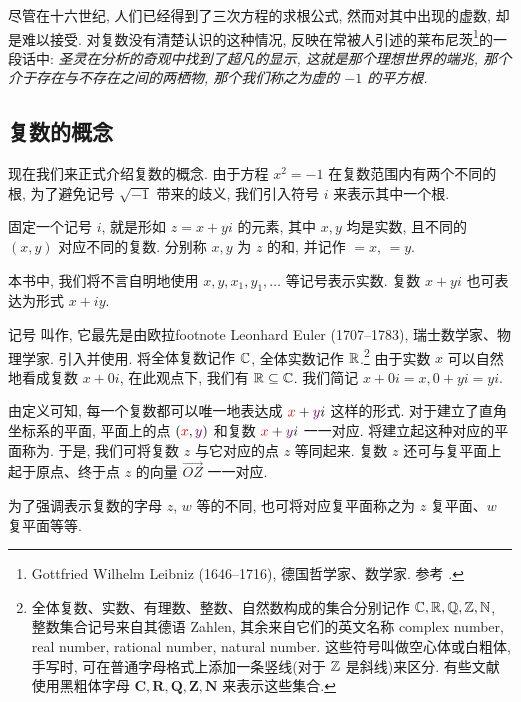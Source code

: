 尽管在十六世纪, 人们已经得到了三次方程的求根公式, 然而对其中出现的虚数, 却是难以接受.
对复数没有清楚认识的这种情况, 反映在常被人引述的莱布尼茨\footnote{%
  Gottfried Wilhelm Leibniz (1646--1716), 德国哲学家、数学家.
  参考 \cite[第13章2节]{Kline1990}.
}的一段话中: \textcolor{third}{\itshape 圣灵在分析的奇观中找到了超凡的显示, 这就是那个理想世界的端兆, 那个介于存在与不存在之间的两栖物, 那个我们称之为虚的 $-1$ 的平方根.}




\subsection{复数的概念}

现在我们来正式介绍复数的概念.
由于方程 $x^2=-1$ 在复数范围内有两个不同的根, 为了避免记号 $\sqrt{-1}$ 带来的歧义, 我们引入符号 $i$ 来表示其中一个根.

\begin{definition}
  固定一个记号 $i$, 就是形如 $z=x+yi$ 的元素, 其中 $x,y$ 均是实数, 且不同的 $(x,y)$ 对应不同的复数.
  分别称 $x,y$ 为 $z$ 的和, 并记作 ${}=x$, ${}=y$.
\end{definition}

本书中, 我们将不言自明地使用 $x,y,x_1,y_1,\dots$ 等记号表示实数.
复数 $x+yi$ 也可表达为形式 $x+iy$.

记号  叫作, 它最先是由欧拉footnote{%
  Leonhard Euler (1707--1783), 瑞士数学家、物理学家.
}引入并使用.
将\alert{全体复数记作 ${\mathbb{C}}$}, 全体实数记作 ${\mathbb{R}}$.\footnote{%
  全体复数、实数、有理数、整数、自然数构成的集合分别记作 ${\mathbb{C}},{\mathbb{R}},{\mathbb{Q}},{\mathbb{Z}},{\mathbb{N}}$, 整数集合记号来自其德语 Zahlen, 其余来自它们的英文名称 complex number, real number, rational number, natural number.
  这些符号叫做空心体或白粗体, 手写时, 可在普通字母格式上添加一条竖线(对于 ${\mathbb{Z}}$ 是斜线)来区分.
  有些文献使用黑粗体字母 $\mathbf{C,R,Q,Z,N}$ 来表示这些集合.
}
由于实数 $x$ 可以自然地看成复数 $x+0i$, 在此观点下, 我们有 ${\mathbb{R}}\subseteq {\mathbb{C}}$.
我们简记 $x+0i=x,0+yi=yi$.

由定义可知, 每一个复数都可以唯一地表达成 ${\color{second}x}+{\color{third}y}i$ 这样的形式.
对于建立了直角坐标系的平面, 平面上的点 $({\color{second}x},{\color{third}y})$ 和复数 ${\color{second}x}+{\color{third}y}i$ 一一对应.
将建立起这种对应的平面称为.
于是, 我们可将复数 $z$ 与它对应的点 $z$ 等同起来.
复数 $z$ 还可与复平面上起于原点、终于点 $z$ 的向量 $\overrightarrow{OZ}$ 一一对应.

为了强调表示复数的字母 $z$, $w$ 等的不同, 也可将对应复平面称之为 $z$ 复平面、$w$ 复平面等等.

